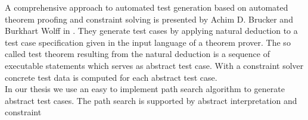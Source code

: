 A comprehensive approach to automated test generation based on automated theorem proofing and constraint solving is presented by Achim D. Brucker and Burkhart Wolff in \cite{brucker2012theoremProverBasedTesting}. They generate test cases by applying natural deduction to a %
test case specification given in the input language of a theorem prover. The so called test theorem resulting from the natural deduction is a sequence of executable statements which serves as abstract test case. With a constraint solver concrete test data is computed for each abstract test case.\\
In our thesis we use an easy to implement path search algorithm to generate abstract test cases. The path search is supported by abstract interpretation and constraint 
% 
